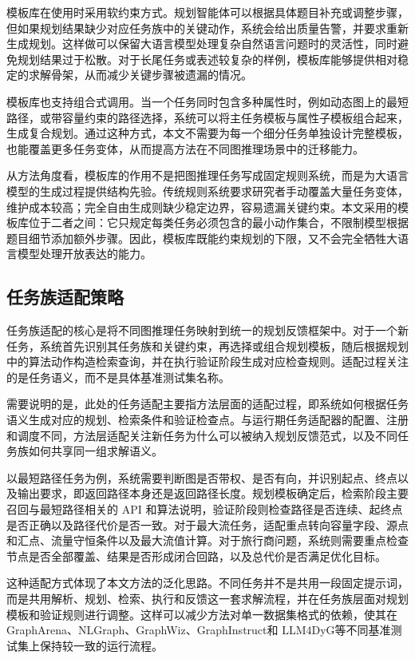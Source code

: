 模板库在使用时采用软约束方式。规划智能体可以根据具体题目补充或调整步骤，但如果规划结果缺少对应任务族中的关键动作，系统会给出质量告警，并要求重新生成规划。这样做可以保留大语言模型处理复杂自然语言问题时的灵活性，同时避免规划结果过于松散。对于长尾任务或表述较复杂的样例，模板库能够提供相对稳定的求解骨架，从而减少关键步骤被遗漏的情况。

模板库也支持组合式调用。当一个任务同时包含多种属性时，例如动态图上的最短路径，或带容量约束的路径选择，系统可以将主任务模板与属性子模板组合起来，生成复合规划。通过这种方式，本文不需要为每一个细分任务单独设计完整模板，也能覆盖更多任务变体，从而提高方法在不同图推理场景中的迁移能力。

从方法角度看，模板库的作用不是把图推理任务写成固定规则系统，而是为大语言模型的生成过程提供结构先验。传统规则系统要求研究者手动覆盖大量任务变体，维护成本较高；完全自由生成则缺少稳定边界，容易遗漏关键约束。本文采用的模板库位于二者之间：它只规定每类任务必须包含的最小动作集合，不限制模型根据题目细节添加额外步骤。因此，模板库既能约束规划的下限，又不会完全牺牲大语言模型处理开放表达的能力。

\subsection{任务族适配策略}

任务族适配的核心是将不同图推理任务映射到统一的规划反馈框架中。对于一个新任务，系统首先识别其任务族和关键约束，再选择或组合规划模板，随后根据规划中的算法动作构造检索查询，并在执行验证阶段生成对应检查规则。适配过程关注的是任务语义，而不是具体基准测试集名称。

需要说明的是，此处的任务适配主要指方法层面的适配过程，即系统如何根据任务语义生成对应的规划、检索条件和验证检查点。与运行期任务适配器的配置、注册和调度不同，方法层适配关注新任务为什么可以被纳入规划反馈范式，以及不同任务族如何共享同一组求解语义。

以最短路径任务为例，系统需要判断图是否带权、是否有向，并识别起点、终点以及输出要求，即返回路径本身还是返回路径长度。规划模板确定后，检索阶段主要召回与最短路径相关的 API 和算法说明，验证阶段则检查路径是否连续、起终点是否正确以及路径代价是否一致。对于最大流任务，适配重点转向容量字段、源点和汇点、流量守恒条件以及最大流值计算。对于旅行商问题，系统则需要重点检查节点是否全部覆盖、结果是否形成闭合回路，以及总代价是否满足优化目标。

这种适配方式体现了本文方法的泛化思路。不同任务并不是共用一段固定提示词，而是共用解析、规划、检索、执行和反馈这一套求解流程，并在任务族层面对规划模板和验证规则进行调整。这样可以减少方法对单一数据集格式的依赖，使其在 GraphArena\cite{tang2025grapharena}、NLGraph\cite{chen2024nlgraph}、GraphWiz\cite{gong2024graphwiz}、GraphInstruct\cite{graphinstruct2024}和 LLM4DyG\cite{llm4dyg2024}等不同基准测试集上保持较一致的运行流程。

